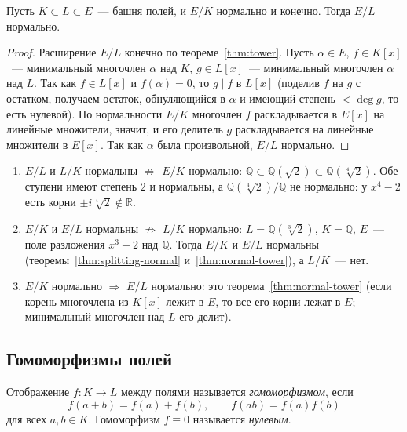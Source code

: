 \documentclass[12pt]{article}
\begin{document}
	\begin{theorem}\label{thm:normal-tower}
		Пусть $K \subset L \subset E$~--- башня полей, и $E/K$ нормально и конечно. Тогда $E/L$ нормально.
	\end{theorem}
	\begin{proof}
		Расширение $E/L$ конечно по теореме~\ref{thm:tower}. Пусть $\alpha \in E$, $f \in K[x]$~--- минимальный многочлен $\alpha$ над $K$, $g \in L[x]$~--- минимальный многочлен $\alpha$ над $L$. Так как $f \in L[x]$ и $f(\alpha) = 0$, то $g \mid f$ в $L[x]$ (поделив $f$ на $g$ с остатком, получаем остаток, обнуляющийся в $\alpha$ и имеющий степень $< \deg g$, то есть нулевой). По нормальности $E/K$ многочлен $f$ раскладывается в $E[x]$ на линейные множители, значит, и его делитель $g$ раскладывается на линейные множители в $E[x]$. Так как $\alpha$ была произвольной, $E/L$ нормально.
	\end{proof}

	\begin{example}
		\begin{enumerate}
			\item $E/L$ и $L/K$ нормальны $\not\Rightarrow$ $E/K$ нормально: $\mathbb{Q} \subset \mathbb{Q}(\sqrt2) \subset \mathbb{Q}(\sqrt[4]{2})$. Обе ступени имеют степень $2$ и нормальны, а $\mathbb{Q}(\sqrt[4]{2})/\mathbb{Q}$ не нормально: у $x^4 - 2$ есть корни $\pm i\sqrt[4]{2} \notin \mathbb{R}$.
			\item $E/K$ и $E/L$ нормальны $\not\Rightarrow$ $L/K$ нормально: $L = \mathbb{Q}(\sqrt[3]{2})$, $K = \mathbb{Q}$, $E$~--- поле разложения $x^3 - 2$ над $\mathbb{Q}$. Тогда $E/K$ и $E/L$ нормальны (теоремы~\ref{thm:splitting-normal} и~\ref{thm:normal-tower}), а $L/K$~--- нет.
			\item $E/K$ нормально $\Rightarrow$ $E/L$ нормально: это теорема~\ref{thm:normal-tower} (если корень многочлена из $K[x]$ лежит в $E$, то все его корни лежат в $E$; минимальный многочлен над $L$ его делит).
		\end{enumerate}
	\end{example}

	\subsection{Гомоморфизмы полей}

	\begin{definition}\label{def:field-hom}
		Отображение $f: K \to L$ между полями называется \emph{гомоморфизмом}, если
		\[
			f(a+b) = f(a)+f(b), \qquad f(ab) = f(a)f(b)
		\]
		для всех $a, b \in K$. Гомоморфизм $f \equiv 0$ называется \emph{нулевым}.
	\end{definition}
\end{document}
